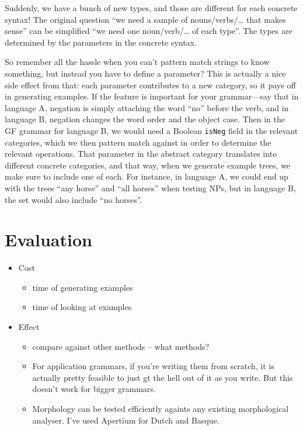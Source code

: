 Suddenly, we have a bunch of new types, and those are different for
each concrete syntax! The original question ``we need a sample of
nouns/verbs/… that makes sense'' can be simplified ``we need one
noun/verb/… of each type''. The types are determined by the parameters
in the concrete syntax. 

So remember all the hassle when you can't pattern match strings to
know something, but instead you have to define a parameter? This is
actually a nice side effect from that: each parameter contributes to a
new category, so it pays off in generating examples. If the feature is
important for your grammar---say that in language A, negation is
simply attaching the word  ``no'' before the verb, and in language B,
negation changes the word order and the object case. Then in the GF
grammar for language B, we would need a Boolean \texttt{isNeg} field
in the relevant categories, which we then pattern match against in
order to determine the relevant operations. That parameter in the
abstract category translates into different concrete categories, and
that way, when we generate example trees, we make sure to include one
of each. For instance, in language A, we could end up with the trees
``any horse'' and ``all horses'' when testing NPs, but in language B,
the set would also include ``no horses''. 



\section{Evaluation}


\begin{itemize}
\item Cost
  \begin{itemize}
  \item time of generating examples
  \item time of looking at examples
  \end{itemize}

\item Effect
  \begin{itemize}
  \item compare against other methods -- what methods?
  \item For application grammars, if you're writing them from scratch, it is actually pretty feasible to just gt the hell out of it as you write. But this doesn't work for bigger grammars.
  \item Morphology can be tested efficiently againts any existing morphological analyser. I've used Apertium for Dutch and Basque.
  \end{itemize}
\end{itemize}


